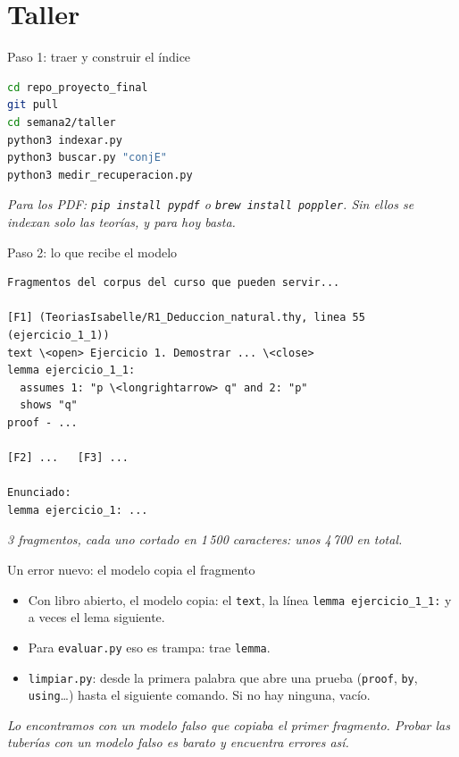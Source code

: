 \documentclass[10pt]{beamer}
\newcommand{\nota}[1]{{\small\itshape\color{psCom} #1}}
\newcommand{\cd}[1]{\texttt{#1}}
\begin{document}
\section{Taller}

\begin{frame}[fragile]{Paso 1: traer y construir el índice}
\begin{lstlisting}[language=bash]
cd repo_proyecto_final
git pull
cd semana2/taller
python3 indexar.py
python3 buscar.py "conjE"
python3 medir_recuperacion.py
\end{lstlisting}
  \nota{Para los PDF: \cd{pip install pypdf} o \cd{brew install poppler}.
  Sin ellos se indexan solo las teorías, y para hoy basta.}
\end{frame}

\begin{frame}[fragile]{Paso 2: lo que recibe el modelo}
\begin{lstlisting}
Fragmentos del corpus del curso que pueden servir...

[F1] (TeoriasIsabelle/R1_Deduccion_natural.thy, linea 55 (ejercicio_1_1))
text \<open> Ejercicio 1. Demostrar ... \<close>
lemma ejercicio_1_1:
  assumes 1: "p \<longrightarrow> q" and 2: "p"
  shows "q"
proof - ...

[F2] ...   [F3] ...

Enunciado:
lemma ejercicio_1: ...
\end{lstlisting}
  \nota{3 fragmentos, cada uno cortado en 1\,500 caracteres: unos 4\,700 en
  total.}
\end{frame}

\begin{frame}{Un error nuevo: el modelo copia el fragmento}
  \begin{itemize}
    \item Con libro abierto, el modelo copia: el \cd{text}, la línea
      \cd{lemma ejercicio\_1\_1:} y a veces el lema siguiente.
    \item Para \cd{evaluar.py} eso es \alert{trampa}: trae \cd{lemma}.
    \item \cd{limpiar.py}: desde la primera palabra que abre una prueba
      (\cd{proof}, \cd{by}, \cd{using}\ldots) hasta el siguiente comando.
      Si no hay ninguna, vacío.
  \end{itemize}
  \vspace{0.4em}
  \nota{Lo encontramos con un modelo falso que copiaba el primer fragmento.
  Probar las tuberías con un modelo falso es barato y encuentra errores
  así.}
\end{frame}
\end{document}
